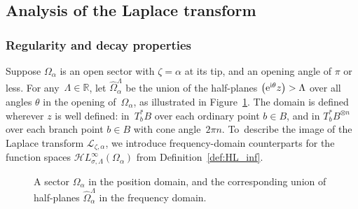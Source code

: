 \documentclass[pdftex]{sigma}
\let\Re\relax
\DeclareMathOperator{\Re}{Re}
\newcommand{\singexp}[2]{\mathcal{H}L^\infty_{#1, #2}}
\newcommand{\R}{\mathbb{R}}
\newcommand{\laplace}{\mathcal{L}}
\numberwithin{equation}{section}
\begin{document}
\subsection{Analysis of the Laplace transform}\label{sec:laplace_analytic}
%
\subsubsection{Regularity and decay properties}\label{sec:reg-decay}
%
Suppose $\Omega_\alpha$ is an open sector with $\zeta = \alpha$ at its tip, and an opening angle of $\pi$ or less. For any~${\Lambda \in \R}$, let $\widehat{\Omega}_\alpha^\Lambda$ be the union of the half-planes $\Re\bigl({\rm e}^{{\rm i}\theta} z\bigr) > \Lambda$ over all angles $\theta$ in the opening of~$\Omega_\alpha$, as illustrated in Figure~\ref{fig:sectorial_domain-pos-fre}. The domain \smash{$\widehat{\Omega}_\alpha^\Lambda$} is defined wherever $z$ is well defined: in~$T_b^*B$ over each ordinary point $b \in B$, and in $T_b^*B^{\otimes n}$ over each branch point $b \in B$ with cone angle~$2\pi n$.
To~describe the image of the Laplace transform $\laplace_{\zeta,\alpha}$, we introduce frequency-domain counterparts for the function spaces $\singexp{\sigma}{\Lambda}(\Omega_\alpha)$ from Definition~\ref{def:HL_inf}.

\begin{figure}[!ht]\centering
{}
\caption{A sector $\Omega_\alpha$ in the position domain, and the corresponding union of half-planes $\widehat{\Omega}_\alpha^\Lambda$ in the frequency domain.}\label{fig:sectorial_domain-pos-fre}
\end{figure}
\end{document}
